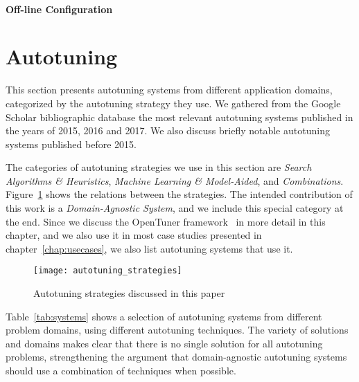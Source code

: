 \paragraph{Off-line Configuration}
\label{sec:offconfig}

%
%

\section{Autotuning}
\label{sec:autotuning}

This section presents autotuning systems from different application domains,
categorized by the autotuning strategy they use. We gathered from the Google
Scholar bibliographic database the most relevant autotuning systems published
in the years of 2015, 2016 and 2017. We also discuss briefly notable autotuning
systems published before 2015.

The categories of autotuning strategies we use in this section are
\textit{Search Algorithms \& Heuristics}, \textit{Machine Learning \&
Model-Aided}, and \textit{Combinations}. Figure~\ref{fig:strategies} shows the
relations between the strategies. The intended contribution of this work is a
\textit{Domain-Agnostic System}, and we include this special category at the
end. Since we discuss the OpenTuner framework~\cite{ansel2014opentuner} in more
detail in this chapter, and we also use it in most case studies presented in
chapter~\ref{chap:usecases}, we also list autotuning systems that use it.

\begin{figure}[htpb]
    \centering
    \texttt{[image: autotuning\_strategies]}
    \caption{Autotuning strategies discussed in this paper}
    \label{fig:strategies}
\end{figure}

Table~\ref{tab:systems} shows a selection of autotuning systems from different
problem domains, using different autotuning techniques. The variety of solutions
and domains makes clear that there is no single solution for all autotuning
problems, strengthening the argument that domain-agnostic autotuning systems
should use a combination of techniques when possible.

